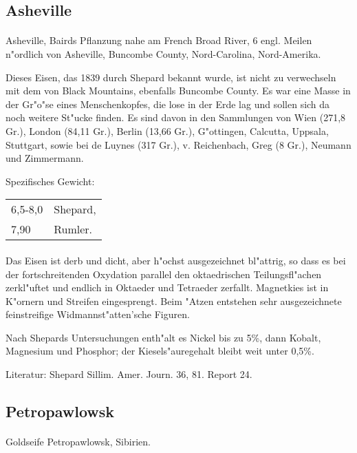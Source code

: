 \documentclass[a4paper, 11pt, oneside]{article}
\begin{document}
\subsection{Asheville}
\normalsize
\paragraph{}
Asheville, Bairds Pflanzung nahe am French Broad River, 6 engl. Meilen n"ordlich von Asheville, Buncombe County, Nord-Carolina, Nord-Amerika.

Dieses Eisen, das 1839 durch Shepard bekannt wurde, ist nicht zu verwechseln mit dem von Black Mountains, ebenfalls Buncombe County. Es war eine Masse in der Gr"o"se eines Menschenkopfes, die lose in der Erde lag und sollen sich da noch weitere St"ucke finden. Es sind davon in den Sammlungen von Wien (271,8 Gr.), London (84,11 Gr.), Berlin (13,66 Gr.), G"ottingen, Calcutta, Uppsala, Stuttgart, sowie bei de Luynes (317 Gr.), v. Reichenbach, Greg (8 Gr.), Neumann und Zimmermann.

Spezifisches Gewicht:  
\begin{table}[!ht]
    \centering
    \begin{tabular}{l l}
        6,5-8,0 & Shepard,\\
        7,90 & Rumler.
    \end{tabular}
\end{table}
\paragraph{}
Das Eisen ist derb und dicht, aber h"ochst ausgezeichnet bl"attrig, so dass es bei der fortschreitenden Oxydation parallel den oktaedrischen Teilungsfl"achen zerkl"uftet und endlich in Oktaeder und Tetraeder zerfallt. Magnetkies ist in K"ornern und Streifen eingesprengt. Beim "Atzen entstehen sehr ausgezeichnete feinstreifige Widmannst"atten'sche Figuren.

Nach Shepards Untersuchungen enth"alt es Nickel bis zu 5\%, dann Kobalt, Magnesium und Phosphor; der Kiesels"auregehalt bleibt weit unter 0,5\%.

Literatur: Shepard Sillim. Amer. Journ. 36, 81. Report 24.

\subsection{Petropawlowsk}
\normalsize
\paragraph{}
Goldseife Petropawlowsk, Sibirien.
\end{document}

